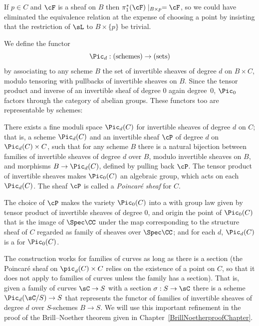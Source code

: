 If $p \in C$ and $\cF$ is a sheaf on $B$ then $\pi_1^*(\cF)\mid_{B\times p} = \cF$, so we could have eliminated the
equivalence relation at the expense of choosing a point by insisting that the restriction of $\sL$ to $B \times \{p\}$ be trivial.
 
We define the functor
%
 $$
 \Pic_d : (\textrm{schemes}) \to (\textrm{sets})
 $$
by associating to any scheme $B$ the set of invertible sheaves of
degree $d$ on $B \times C$, modulo tensoring with pullbacks of
invertible sheaves on $B$. Since the tensor product and inverse of an
invertible sheaf of degree 0 again 
degree~0, 
$\Pic_0$ factors through the category of abelian groups. These
functors too are representable by schemes:
  
\begin{fact}
There exists a fine moduli space $\Pic_d(C)$ for invertible sheaves of
degree $d$ on $C$; that is, a scheme $\Pic_d(C)$ and an invertible
sheaf $\cP$ of degree $d$ on $\Pic_d(C) \times C$, such that for any
scheme $B$ there is a natural bijection between families of invertible
sheaves of degree $d$ over $B$, modulo invertible sheaves on $B$, and
morphisms $B \to \Pic_d(C)$, defined by pulling back $\cP$. The tensor
product of invertible sheaves makes $\Pic_0(C)$ an algebraic group,
which acts on each $\Pic_d(C)$. The sheaf $\cP$ is called a
%
\emph{Poincar\'e sheaf} for $C$. 

The choice of $\cP$ makes the variety $\Pic_0(C)$ into a 
%
%
with group law given by tensor product of
invertible sheaves of degree 0, and origin the point of $\Pic_0(C)$
that is the 
 image of $\Spec \CC$ under the map corresponding to the structure sheaf of $C$ regarded
 as family of sheaves over $\Spec \CC$; and for each $d$, $\Pic_d(C)$
 is a 
%
for $\Pic_0(C)$. 

The construction works for families of curves as long as there is a section (the Poincar\'e sheaf on $\pic_d(C) \times C$ relies on the existence of a point on $C$, so that it does not apply to families of curves unless the family has a section). That is, given a family of curves $\sC \to S$ with a section $\sigma: S\to \sC$
 there is a scheme $\Pic_{d}(\sC/S) \to S$ that represents the functor of families of invertible sheaves of
 degree $d$ over $S$-schemes $B\to S$. We will use this important refinement in the proof of the Brill--Noether theorem given in Chapter~\ref{BrillNoetherproofChapter}.
  \end{fact}
  
